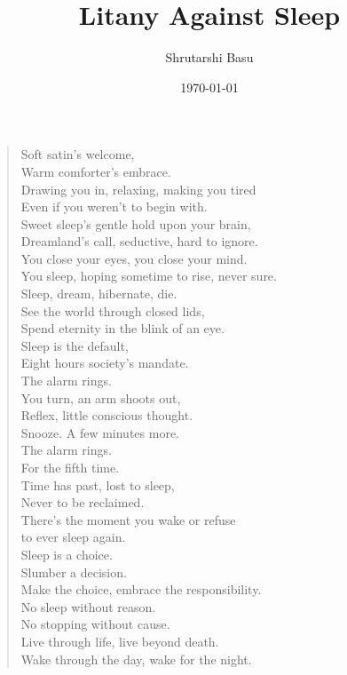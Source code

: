\documentclass[11pt,letterpaper]{article}
\title{Litany Against Sleep}
\author{Shrutarshi Basu}
\date{\today}
\begin{document}
\maketitle
\begin{verse}

Soft satin's welcome,\\
Warm comforter's embrace.\\
Drawing you in, relaxing, making you tired\\
Even if you weren't to begin with.\\
Sweet sleep's gentle hold upon your brain,\\
Dreamland's call, seductive, hard to ignore.\\
You close your eyes, you close your mind.\\
You sleep, hoping sometime to rise, never sure.\\

Sleep, dream, hibernate, die.\\
See the world through closed lids,\\
Spend eternity in the blink of an eye.\\
Sleep is the default,\\
Eight hours society's mandate.\\

The alarm rings.\\
You turn, an arm shoots out,\\
Reflex, little conscious thought.\\
Snooze. A few minutes more.\\

The alarm rings.\\
For the fifth time.\\
Time has past, lost to sleep,\\
Never to be reclaimed.\\
There's the moment you wake or refuse\\
to ever sleep again.\\

Sleep is a choice.\\
Slumber a decision.\\
Make the choice, embrace the responsibility.\\
No sleep without reason.\\
No stopping without cause.\\
Live through life, live beyond death.\\
Wake through the day, wake for the night.\\


\end{verse}
\end{document}
